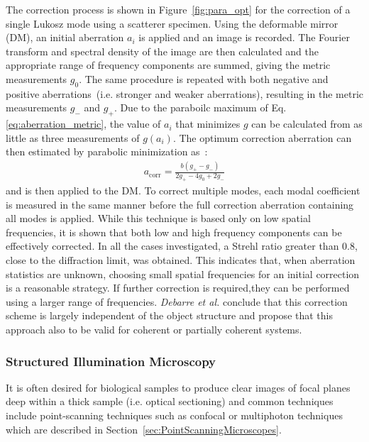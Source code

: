 The correction process is shown in Figure~\ref{fig:para_opt} for the correction of a single Lukosz mode using a scatterer specimen. Using the deformable mirror (DM), an initial aberration $a_i$ is applied and an image is recorded. The Fourier transform and spectral density of the image are then calculated and the appropriate range of frequency components are summed, giving the metric measurements $g_0$. The same procedure is repeated with both negative and positive aberrations~(i.e. stronger and weaker aberrations), resulting in the metric measurements $g_-$ and  $g_+$. Due to the paraboilc maximum of Eq. \eqref{eq:aberration_metric}, the value of $a_i$ that minimizes $g$ can be calculated from as little as three measurements of $g(a_i)$. The optimum correction aberration can then estimated by parabolic minimization as~\cite{wide_parabolic_optimization}:
\begin{align}
	a_\text{corr} = \frac{b(g_+ - g_-)}{2g_+ - 4g_0 + 2g_-}
\end{align}
and is then applied to the DM. To correct multiple modes, each modal coefficient is measured in the same manner before the full correction aberration containing all modes is applied. While this technique is based only on low spatial frequencies, it is shown that both low and high frequency components can be effectively corrected. In all the cases investigated, a Strehl ratio greater than 0.8, close to the diffraction limit, was obtained. This indicates that, when aberration statistics are unknown, choosing small spatial frequencies for an initial correction is a reasonable strategy. If further correction is required,they can be performed using a larger range of frequencies. \emph{Debarre et al.} conclude that this correction scheme is largely independent of the object structure and propose that this approach also to be valid for coherent or partially coherent systems.

\subsubsection{Structured Illumination Microscopy}
\label{sec:StructuredIlluminationMicroscopy}

It is often desired for biological samples to produce clear images of focal planes deep within a thick sample (i.e. optical sectioning) and common techniques include point-scanning techniques such as confocal or multiphoton techniques which are described in Section~\ref{sec:PointScanningMicroscopes}. 

